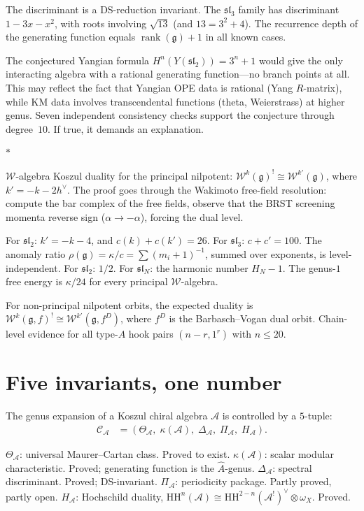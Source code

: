 \documentclass[11pt]{article}
\newcommand{\cA}{\mathcal{A}}
\newcommand{\cC}{\mathcal{C}}
\newcommand{\cW}{\mathcal{W}}
\newcommand{\fg}{\mathfrak{g}}
\newcommand{\fsl}{\mathfrak{sl}}
\newcommand{\sep}{\bigskip\begin{center}$*$\end{center}\medskip}
\begin{document}
The discriminant is a DS-reduction invariant.  The $\fsl_3$ family
has discriminant $1 - 3x - x^2$, with roots involving $\sqrt{13}$
(and $13 = 3^2 + 4$).  The recurrence depth of the generating
function equals $\operatorname{rank}(\fg) + 1$ in all known cases.

The conjectured Yangian formula $H^n(Y(\fsl_2)) = 3^n + 1$ would
give the only interacting algebra with a rational generating
function---no branch points at all.  This may reflect the fact that
Yangian OPE data is rational (Yang $R$-matrix), while KM data
involves transcendental functions (theta, Weierstrass) at higher
genus.  Seven independent consistency checks support the conjecture
through degree~$10$.  If true, it demands an explanation.

\sep

$\cW$-algebra Koszul duality for the principal nilpotent:
$\cW^k(\fg)^! \cong \cW^{k'}(\fg)$, where $k' = -k - 2h^\vee$.
The proof goes through the Wakimoto free-field resolution:
compute the bar complex of the free fields, observe that the BRST
screening momenta reverse sign ($\alpha \to -\alpha$), forcing the
dual level.

For $\fsl_2$: $k' = -k-4$, and $c(k) + c(k') = 26$.  For
$\fsl_3$: $c + c' = 100$.  The anomaly ratio
$\rho(\fg) = \kappa/c = \sum (m_i+1)^{-1}$, summed over exponents,
is level-independent.  For $\fsl_2$: $1/2$.  For $\fsl_N$:
the harmonic number $H_N - 1$.  The genus-$1$ free energy is
$\kappa/24$ for every principal $\cW$-algebra.

For non-principal nilpotent orbits, the expected duality is
$\cW^k(\fg,f)^! \cong \cW^{k'}(\fg, f^D)$, where $f^D$ is
the Barbasch--Vogan dual orbit.  Chain-level evidence for all
type-$A$ hook pairs $(n-r, 1^r)$ with $n \leq 20$.


\section{Five invariants, one number}
\label{sec:five}

The genus expansion of a Koszul chiral algebra $\cA$ is controlled
by a $5$-tuple:
\begin{align*}
\cC_\cA &= (\Theta_\cA,\;\kappa(\cA),\;\Delta_\cA,\;
\Pi_\cA,\;H_\cA).
\end{align*}

$\Theta_\cA$: universal Maurer--Cartan class.  Proved to exist.
$\kappa(\cA)$: scalar modular characteristic.  Proved; generating
function is the $\hat{A}$-genus.
$\Delta_\cA$: spectral discriminant.  Proved; DS-invariant.
$\Pi_\cA$: periodicity package.  Partly proved, partly open.
$H_\cA$: Hochschild duality,
$\mathrm{HH}^n(\cA) \cong \mathrm{HH}^{2-n}(\cA^!)^\vee
\otimes \omega_X$.  Proved.
\end{document}
